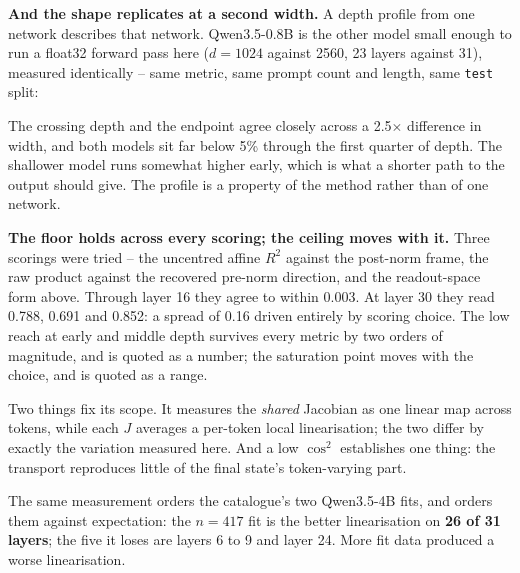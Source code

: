 \documentclass[10pt,letterpaper,twocolumn]{article}
\begin{document}
\textbf{And the shape replicates at a second width.} A depth profile from one network describes that network. Qwen3.5-0.8B is the other model small enough to run a float32 forward pass here (\(d=1024\) against 2560, 23 layers against 31), measured identically -- same metric, same prompt count and length, same \texttt{test} split:


The crossing depth and the endpoint agree closely across a 2.5\(\times\) difference in width, and both models sit far below 5\% through the first quarter of depth. The shallower model runs somewhat higher early, which is what a shorter path to the output should give. The profile is a property of the method rather than of one network.

\textbf{The floor holds across every scoring; the ceiling moves with it.} Three scorings were tried -- the uncentred affine \(R^2\) against the post-norm frame, the raw product against the recovered pre-norm direction, and the readout-space form above. Through layer 16 they agree to within 0.003. At layer 30 they read 0.788, 0.691 and 0.852: a spread of 0.16 driven entirely by scoring choice. The low reach at early and middle depth survives every metric by two orders of magnitude, and is quoted as a number; the saturation point moves with the choice, and is quoted as a range.

Two things fix its scope. It measures the \emph{shared} Jacobian as one linear map across tokens, while each \(J\) averages a per-token local linearisation; the two differ by exactly the variation measured here. And a low \(\cos^2\) establishes one thing: the transport reproduces little of the final state's token-varying part.

The same measurement orders the catalogue's two Qwen3.5-4B fits, and orders them against expectation: the \(n=417\) fit is the better linearisation on \textbf{26 of 31 layers}; the five it loses are layers 6 to 9 and layer 24. More fit data produced a worse linearisation.
\end{document}
